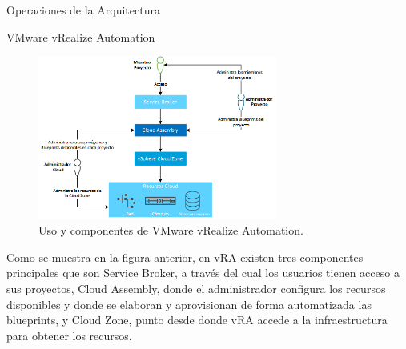\begin{subsection}{Operaciones de la Arquitectura}
\begin{subsubsection}{VMware vRealize Automation}
        \begin{figure}[h]
            \centering
            \includegraphics[width=0.7\textwidth]{imaxes/vRealize_pruebaconcepto/ComponentesVRA.png}
            \caption{Uso y componentes de VMware vRealize Automation.}
            \label{fig:vra-components}
        \end{figure}
        \FloatBarrier
        Como se muestra en la figura anterior, en vRA existen tres componentes principales que son Service Broker, a través del cual los usuarios tienen acceso a sus proyectos, Cloud Assembly, donde el administrador configura los recursos disponibles y donde se elaboran y aprovisionan de forma automatizada las blueprints, y Cloud Zone, punto desde donde vRA accede a la infraestructura para obtener los recursos. 

\end{subsubsection}
\end{subsection}
